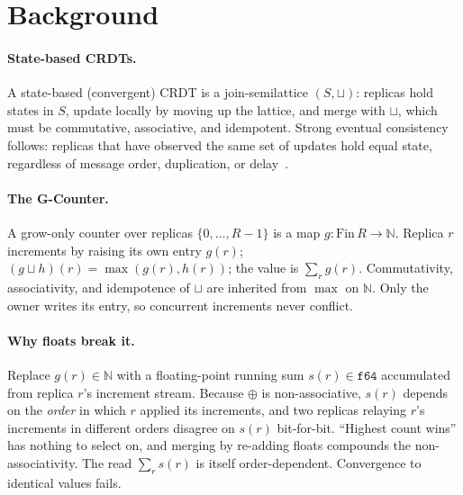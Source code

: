 \documentclass[11pt]{article}
\begin{document}
\section{Background}

\paragraph{State-based CRDTs.} A state-based (convergent) CRDT is a join-semilattice
$(S, \sqcup)$: replicas hold states in $S$, update locally by moving up the lattice, and merge with
$\sqcup$, which must be commutative, associative, and idempotent. Strong eventual consistency follows:
replicas that have observed the same set of updates hold equal state, regardless of message order,
duplication, or delay~\cite{shapiro}.

\paragraph{The G-Counter.} A grow-only counter over replicas $\{0,\dots,R-1\}$ is a map
$g : \mathrm{Fin}\,R \to \mathbb{N}$. Replica $r$ increments by raising its own entry $g(r)$;
$(g \sqcup h)(r) = \max(g(r), h(r))$; the value is $\sum_r g(r)$. Commutativity, associativity, and
idempotence of $\sqcup$ are inherited from $\max$ on $\mathbb{N}$. Only the owner writes its entry, so
concurrent increments never conflict.

\paragraph{Why floats break it.} Replace $g(r) \in \mathbb{N}$ with a floating-point running sum
$s(r) \in \texttt{f64}$ accumulated from replica $r$'s increment stream. Because $\oplus$ is
non-associative, $s(r)$ depends on the \emph{order} in which $r$ applied its increments, and two
replicas relaying $r$'s increments in different orders disagree on $s(r)$ bit-for-bit. ``Highest count
wins'' has nothing to select on, and merging by re-adding floats compounds the non-associativity.
The read $\sum_r s(r)$ is itself order-dependent. Convergence to identical values fails.
\end{document}
